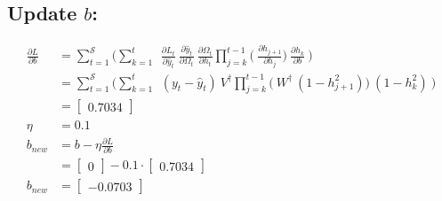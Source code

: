 \documentclass{article}
\begin{document}
\subsection{Update $b$:}
\begin{align*}
     \frac{\partial L}{ \partial{b}} &= \sum_{t=1}^{\mathcal{S}} 
	\bigg(	
	 \sum_{k=1}^{t} ~
	~\frac{\partial L_t}{\partial \hat{y}_t}
        ~\frac{\partial \hat{y}_t}{\partial \Omega_t}
	~\frac{\partial \Omega_t}{\partial h_t}
        \prod_{j=k}^{t-1} \bigg(
	~\frac{\partial h_{j+1}}{\partial h_{j}}
        \bigg)
	~\frac{\partial h_k}{\partial b}~
	\bigg) \\
  &= \sum_{t=1}^{\mathcal{S}} 
	\bigg(	
	 \sum_{k=1}^{t} ~
	~(y_t - \hat{y}_t)
	~V^\dagger
        \prod_{j=k}^{t-1} \bigg(
	~W^\dagger ~ (1 - h_{j+1}^2)
        \bigg)
	~(1-h_k^2)~
	\bigg) \\
 &=\begin{bmatrix}
0.7034
\end{bmatrix} \\
\eta &= 0.1\\
b_{new} &= b - \eta \frac{\partial L}{\partial b}\\
 &= \begin{bmatrix}
0
\end{bmatrix}- 0.1 \cdot \begin{bmatrix}
0.7034 \end{bmatrix} \\
b_{new} &= \begin{bmatrix}
-0.0703
\end{bmatrix}
\end{align*}
\end{document}
